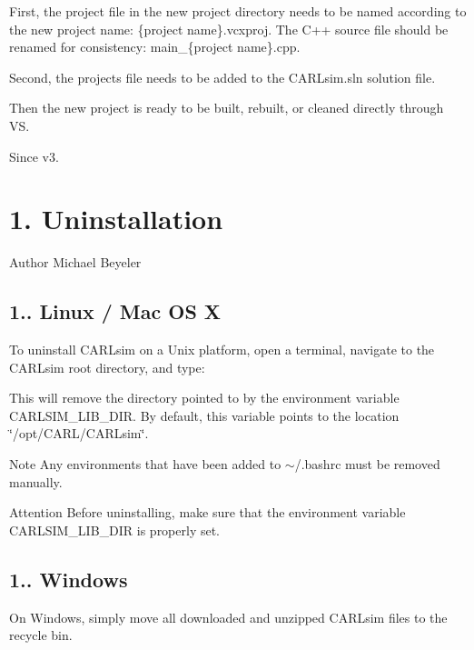 First, the project file in the new project directory needs to be named according to the new project name\+: {\ttfamily \{project name\}.vcxproj}. The C++ source file should be renamed for consistency\+: {\ttfamily main\+\_\+\{project name\}.cpp}.

Second, the projects file needs to be added to the {\ttfamily C\+A\+R\+Lsim.\+sln} solution file.

Then the new project is ready to be built, rebuilt, or cleaned directly through VS.

\begin{DoxySince}{Since}
v3.
\end{DoxySince}
\hypertarget{ch1_getting_started_ch1s4_uninstallation}{}\section{1. Uninstallation}\label{ch1_getting_started_ch1s4_uninstallation}
\begin{DoxyAuthor}{Author}
Michael Beyeler
\end{DoxyAuthor}
\hypertarget{ch1_getting_started_ch1s4s1_linux}{}\subsection{1.. Linux / Mac O\+S X}\label{ch1_getting_started_ch1s4s1_linux}
To uninstall C\+A\+R\+Lsim on a Unix platform, open a terminal, navigate to the C\+A\+R\+Lsim root directory, and type\+: 


This will remove the directory pointed to by the environment variable {\ttfamily C\+A\+R\+L\+S\+I\+M\+\_\+\+L\+I\+B\+\_\+\+D\+IR}. By default, this variable points to the location {\ttfamily \char`\"{}/opt/\+C\+A\+R\+L/\+C\+A\+R\+Lsim\char`\"{}}.

\begin{DoxyNote}{Note}
Any environments that have been added to {\ttfamily $\sim$/.bashrc} must be removed manually. 
\end{DoxyNote}
\begin{DoxyAttention}{Attention}
Before uninstalling, make sure that the environment variable {\ttfamily C\+A\+R\+L\+S\+I\+M\+\_\+\+L\+I\+B\+\_\+\+D\+IR} is properly set.
\end{DoxyAttention}
\hypertarget{ch1_getting_started_ch1s4s2_windows}{}\subsection{1.. Windows}\label{ch1_getting_started_ch1s4s2_windows}
On Windows, simply move all downloaded and unzipped C\+A\+R\+Lsim files to the recycle bin. 
